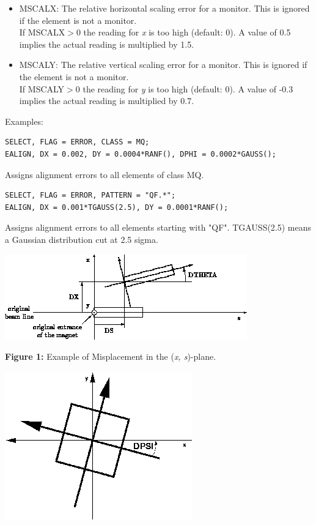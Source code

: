 \begin{itemize}
\item MSCALX: The relative horizontal scaling error for a monitor. This
  is ignored if the element is not a monitor.  
\\ If MSCALX$>$0 the reading for \textit{x} is too high (default: 0). A
value of 0.5 implies the actual reading is multiplied by 1.5.  

\item MSCALY: The relative vertical scaling error for a monitor. This is
  ignored if the element is not a monitor.   
\\ If MSCALY$>$0 the reading for \textit{y} is too high (default: 0). A
value of -0.3 implies the actual reading is multiplied by 0.7.  
\end{itemize}

Examples: 
\begin{verbatim}
SELECT, FLAG = ERROR, CLASS = MQ;                  
EALIGN, DX = 0.002, DY = 0.0004*RANF(), DPHI = 0.0002*GAUSS();
\end{verbatim}
Assigns alignment errors to all elements of class MQ.           



\begin{verbatim}
SELECT, FLAG = ERROR, PATTERN = "QF.*";            
EALIGN, DX = 0.001*TGAUSS(2.5), DY = 0.0001*RANF();
\end{verbatim} 
Assigns alignment errors to all elements starting with "QF". TGAUSS(2.5)
means a Gaussian distribution cut at 2.5 sigma.  


\includegraphics{figures/xs_align.png}

\textbf{Figure 1:} Example of Misplacement in the (\textit{x, s})-plane. 

\includegraphics{error/dpsi.png}

